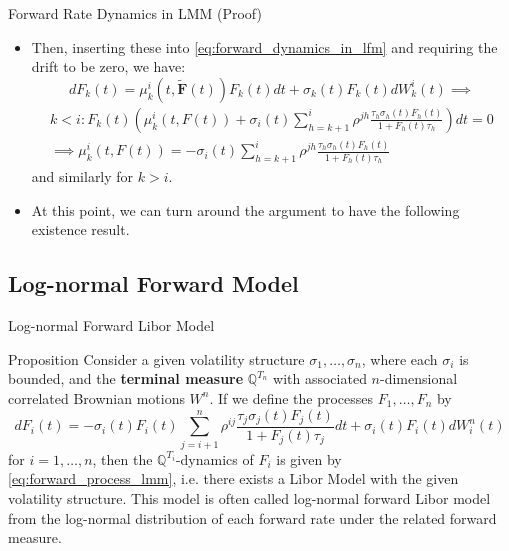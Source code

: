 \documentclass{beamer}
\begin{document}
\begin{frame}{Forward Rate Dynamics in LMM (Proof)}
	\begin{itemize}
	\item<1-> Then, inserting these into \cref{eq:forward_dynamics_in_lfm} and requiring the drift to be zero, we have:
	 \begin{equation*}
		dF_k(t) = \mu_k^i(t, \bm{\tilde{F}}(t))F_k(t)dt + \sigma_k(t)F_k(t)dW^i_k(t) \implies
	\end{equation*}
		\begin{equation*}
			\begin{gathered}
				k < i : F_k(t)\left( \mu_k^i(t, F(t)) + \sigma_i(t)\sum_{h=k+1}^i \rho^{jh} \frac{\tau_h\sigma_h(t)F_h(t)}{1+F_h(t)\tau_h}\right) dt = 0 \\
				\implies \mu_k^i(t, F(t)) = - \sigma_i(t)\sum_{h=k+1}^i \rho^{jh} \frac{\tau_h\sigma_h(t)F_h(t)}{1+F_h(t)\tau_h}
			\end{gathered}
		\end{equation*}
		and similarly for $k > i$.
\myendproof
	\item<2-> At this point, we can turn around the argument to have the following existence result.
	\end{itemize}
\end{frame}

\subsection{Log-normal Forward Model}
\begin{frame}{Log-normal Forward Libor Model}
  \begin{block}{Proposition}
    Consider a given volatility structure $\sigma_1,\ldots, \sigma_n$, where each $\sigma_i$ is bounded, and the \textbf{terminal measure} $\mathbb{Q}^{T_n}$ with associated $n$-dimensional correlated Brownian motions $W^n$. If we define the processes $F_1,\ldots, F_n$ by
    \begin{equation}
      dF_i(t) = -\sigma_i(t)F_i(t)\sum_{j=i+1}^n \rho^{ij} \frac{\tau_j\sigma_j(t)F_j(t)}{1+F_j(t)\tau_j} dt + \sigma_i(t)F_i(t)dW^n_i(t)
    \end{equation}
    for $i = 1,\ldots, n$, then the $\mathbb{Q}^{T_i}$-dynamics of $F_i$ is given by \cref{eq:forward_process_lmm}, i.e. there exists a Libor Model with the given volatility structure.
  This model is often called \textcolor{maincolor}{log-normal forward Libor model} from the log-normal distribution of each forward rate under the related forward measure.
  \end{block}
\end{frame}
\end{document}
